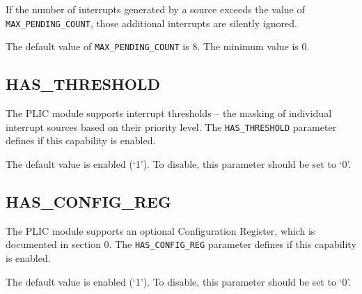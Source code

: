 If the number of interrupts generated by a source exceeds the value of \texttt{MAX\_PENDING\_COUNT}, those additional interrupts are silently ignored.

The default value of \texttt{MAX\_PENDING\_COUNT} is 8. The minimum value is 0.

\subsection{HAS\_THRESHOLD}

The PLIC module supports interrupt thresholds -- the masking of individual interrupt sources based on their priority level.
The \texttt{HAS\_THRESHOLD} parameter defines if this capability is enabled.

The default value is enabled (`1'). To disable, this parameter should be set to `0'.

\subsection{HAS\_CONFIG\_REG}

The PLIC module supports an optional Configuration Register, which is documented in section 0.
The \texttt{HAS\_CONFIG\_REG} parameter defines if this capability is enabled.

The default value is enabled (`1'). To disable, this parameter should be set to `0'.
